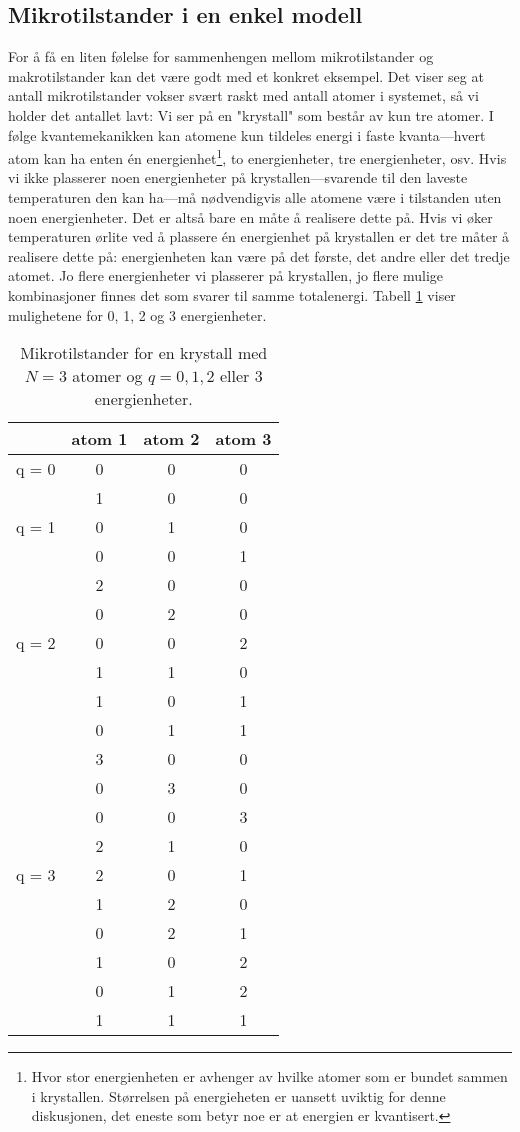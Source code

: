 \subsection{Mikrotilstander i en enkel modell}
For å få en liten følelse for sammenhengen mellom mikrotilstander og makrotilstander kan det være godt med et konkret eksempel. Det viser seg at antall mikrotilstander vokser svært raskt med antall atomer i systemet, så vi holder det antallet lavt: Vi ser på en "krystall" som består av kun tre atomer. I følge kvantemekanikken kan atomene kun tildeles energi i faste kvanta---hvert atom kan ha enten \'en energienhet\footnote{Hvor stor energienheten er avhenger av hvilke atomer som er bundet sammen i krystallen. Størrelsen på energieheten er uansett uviktig for denne diskusjonen, det eneste som betyr noe er at energien er kvantisert.}, to energienheter, tre energienheter, osv. Hvis vi ikke plasserer noen energienheter på krystallen---svarende til den laveste temperaturen den kan ha---må nødvendigvis alle atomene være i tilstanden uten noen energienheter. Det er altså bare en måte å realisere dette på. Hvis vi øker temperaturen ørlite ved å plassere \'en energienhet på krystallen er det tre måter å realisere dette på: energienheten kan være på det første, det andre eller det tredje atomet. Jo flere energienheter vi plasserer på krystallen, jo flere mulige kombinasjoner finnes det som svarer til samme totalenergi. Tabell \ref{tab:t2:multipl} viser mulighetene for 0, 1, 2 og 3 energienheter.

\begin{table}[htp]
\begin{center}
\begin{tabular}{c|ccc}
& atom 1 & atom 2 & atom 3 \\
\hline
\hline
q = 0 & 0 & 0 & 0 \\
\hline
& 1 & 0 & 0 \\
q = 1 & 0 & 1 & 0 \\
& 0 & 0 & 1 \\
\hline
& 2 & 0 & 0 \\
& 0 & 2 & 0 \\
q = 2 & 0 & 0 & 2 \\
& 1 & 1 & 0 \\
& 1 & 0 & 1 \\
& 0 & 1 & 1  \\
\hline
& 3 & 0 & 0 \\
& 0 & 3 & 0 \\
& 0 & 0 & 3 \\
& 2 & 1 & 0 \\
q = 3 & 2 & 0 & 1 \\
& 1 & 2 & 0 \\
& 0 & 2 & 1  \\
& 1 & 0 & 2 \\
& 0 & 1 & 2 \\
& 1 & 1 & 1 \\
\hline
\hline
\end{tabular}
\end{center}
\caption{Mikrotilstander for en krystall med $N=3$ atomer og $q = 0, 1, 2$ eller 3 energienheter.}
\label{tab:t2:multipl}
\end{table}

